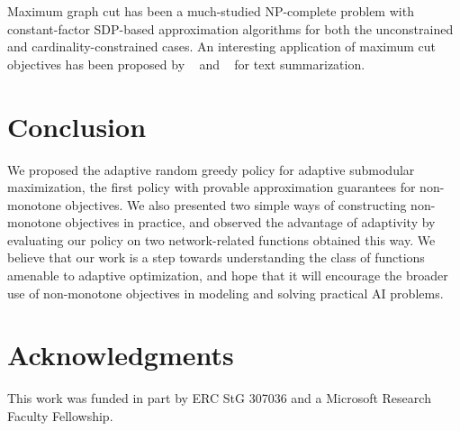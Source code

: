 \documentclass{article}
\newcommand{\citet}[1]{\citeauthor{#1}~\shortcite{#1}}
\begin{document}
Maximum graph cut has been a much-studied NP-complete problem with constant-factor SDP-based approximation algorithms for both the unconstrained \cite{goemans95} and cardinality-constrained \cite{feige01} cases.
An interesting application of maximum cut objectives has been proposed by \citet{lin10} and \citet{lin11} for text summarization.


\section{Conclusion}
We proposed the adaptive random greedy policy for adaptive submodular maximization, the first policy with provable approximation guarantees for non-monotone objectives.
We also presented two simple ways of constructing non-monotone objectives in practice, and observed the advantage of adaptivity by evaluating our policy on two network-related functions obtained this way.
We believe that our work is a step towards understanding the class of functions amenable to adaptive optimization, and hope that it will encourage the broader use of non-monotone objectives in modeling and solving practical AI problems.


\section*{Acknowledgments}
This work was funded in part by ERC StG 307036 and a Microsoft Research Faculty Fellowship.




\iftoggle{short}
{}
{
\clearpage
\appendix
\setcounter{lemma}{0}
\setcounter{theorem}{0}

}
\end{document}
